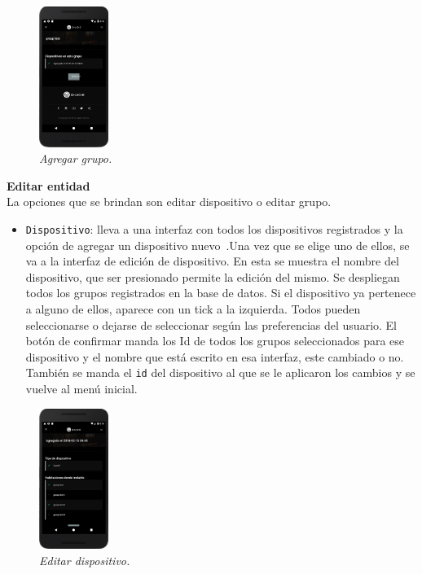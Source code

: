 \begin{figure}[H]
  \centering
  \includegraphics[width=0.2\textwidth, keepaspectratio]{images/app-movil-edit-group}
  \caption{\textit{Agregar grupo.}}
  \label{fig:app-movil-edit-group}
\end{figure}


\textbf{Editar entidad}\\
La opciones que se brindan son editar dispositivo o editar grupo.\\
\begin{itemize}
  \item \lstinline[columns=fixed]{Dispositivo}: lleva a una interfaz con todos los dispositivos registrados y la opción de agregar un dispositivo nuevo~.Una vez que se elige uno de ellos, se va a la interfaz de edición de dispositivo. En esta se muestra el nombre del dispositivo, que ser presionado permite la edición del mismo. Se despliegan todos los grupos registrados en la base de datos. Si el dispositivo ya pertenece a alguno de ellos, aparece con un tick a la izquierda. Todos pueden seleccionarse o dejarse de seleccionar según las preferencias del usuario. El botón de confirmar manda los Id de todos los grupos seleccionados para ese dispositivo y el nombre que está escrito en esa interfaz, este cambiado o no. También se manda el \lstinline[columns=fixed]{id} del dispositivo al que se le aplicaron los cambios y se vuelve al menú inicial.
\end{itemize}

\begin{figure}[H]
  \centering
  \includegraphics[width=0.2\textwidth, keepaspectratio]{images/app-movil-edit-device}
  \caption{\textit{Editar dispositivo.}}
  \label{fig:app-movil-edit-device}
\end{figure}


